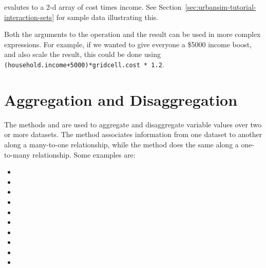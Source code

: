 evalutes to a 2-d array of cost times income.  See 
Section~\ref{sec:urbansim-tutorial-interaction-sets} for sample data illustrating this.

Both the arguments to the operation and the result can be used in more
complex expressions.  For example, if we wanted to give everyone
a \$5000 income boost, and also scale the result, this could be done using
\verb|(household.income+5000)*gridcell.cost * 1.2|.

\section{Aggregation and Disaggregation}
\label{sec:aggregation}
 

The methods  and  are used to
aggregate and disaggregate variable values over two or more datasets.  
  The  method associates
information from one dataset to another along a many-to-one relationship, while
the  method does the same along a one-to-many relationship. Some
examples are:

\begin{itemize}
\item {}

\item {}

\item {}

\item {}

\item {}

\item {}

\item {}

\item {}

\item {}

\item {}

\end{itemize}

